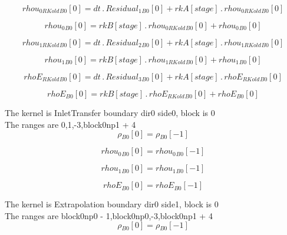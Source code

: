 \documentclass{article}
\begin{document}
\begin{dmath}{rhou_{0 RKold}{_{B0}}}[{0}] = dt \,.\, {Residual_{1}{_{B0}}}[{0}] + {rkA}[{stage}] \,.\, {rhou_{0 RKold}{_{B0}}}[{0}]\end{dmath}

\begin{dmath}{rhou_{0}{_{B0}}}[{0}] = {rkB}[{stage}] \,.\, {rhou_{0 RKold}{_{B0}}}[{0}] + {rhou_{0}{_{B0}}}[{0}]\end{dmath}

\begin{dmath}{rhou_{1 RKold}{_{B0}}}[{0}] = dt \,.\, {Residual_{2}{_{B0}}}[{0}] + {rkA}[{stage}] \,.\, {rhou_{1 RKold}{_{B0}}}[{0}]\end{dmath}

\begin{dmath}{rhou_{1}{_{B0}}}[{0}] = {rkB}[{stage}] \,.\, {rhou_{1 RKold}{_{B0}}}[{0}] + {rhou_{1}{_{B0}}}[{0}]\end{dmath}

\begin{dmath}{rhoE_{RKold}{_{B0}}}[{0}] = dt \,.\, {Residual_{3}{_{B0}}}[{0}] + {rkA}[{stage}] \,.\, {rhoE_{RKold}{_{B0}}}[{0}]\end{dmath}

\begin{dmath}{rhoE{_{B0}}}[{0}] = {rkB}[{stage}] \,.\, {rhoE_{RKold}{_{B0}}}[{0}] + {rhoE{_{B0}}}[{0}]\end{dmath}

\noindent The kernel is InletTransfer boundary dir0 side0, block is 0\\\noindent The ranges are 0,1,-3,block0np1 + 4\\\begin{dmath}{\rho{_{B0}}}[{0}] = {\rho{_{B0}}}[{-1}]\end{dmath}

\begin{dmath}{rhou_{0}{_{B0}}}[{0}] = {rhou_{0}{_{B0}}}[{-1}]\end{dmath}

\begin{dmath}{rhou_{1}{_{B0}}}[{0}] = {rhou_{1}{_{B0}}}[{-1}]\end{dmath}

\begin{dmath}{rhoE{_{B0}}}[{0}] = {rhoE{_{B0}}}[{-1}]\end{dmath}

\noindent The kernel is Extrapolation boundary dir0 side1, block is 0\\\noindent The ranges are block0np0 - 1,block0np0,-3,block0np1 + 4\\\begin{dmath}{\rho{_{B0}}}[{0}] = {\rho{_{B0}}}[{-1}]\end{dmath}
\end{document}
